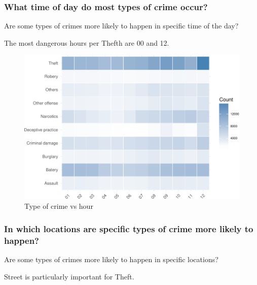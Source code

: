 \documentclass[]{article}
\begin{document}
\subsubsection{What time of day do most types of crime
occur?}\label{what-time-of-day-do-most-types-of-crime-occur}

Are some types of crimes more likely to happen in specific time of the
day?

The most dangerous hours per Thefth are 00 and 12.

\begin{figure}[H]

{\centering \includegraphics{Assessment_1v9_files/figure-latex/fig9-1} 

}

\caption{Type of crime vs hour}\label{fig:fig9}
\end{figure}

\subsubsection{In which locations are specific types of crime more
likely to
happen?}\label{in-which-locations-are-specific-types-of-crime-more-likely-to-happen}

Are some types of crimes more likely to happen in specific locations?

Street is particularly important for Theft.
\end{document}
